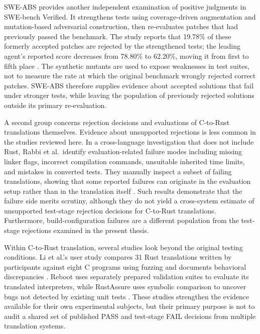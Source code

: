 SWE-ABS provides another independent examination of positive judgments
in SWE-bench Verified. It strengthens tests using coverage-driven
augmentation and mutation-based adversarial construction, then
re-evaluates patches that had previously passed the benchmark. The study
reports that 19.78\% of these formerly accepted patches are rejected by
the strengthened tests; the leading agent's reported score decreases
from 78.80\% to 62.20\%, moving it from first to fifth place
\cite{yu2026sweabs}. The synthetic mutants are used to expose weaknesses
in test suites, not to measure the rate at which the original benchmark
wrongly rejected correct patches. SWE-ABS therefore supplies evidence
about accepted solutions that fail under stronger tests, while leaving
the population of previously rejected solutions outside its primary
re-evaluation.

A second group concerns rejection decisions and evaluations of C-to-Rust
translations themselves. Evidence about unsupported rejections is less
common in the studies reviewed here. In a cross-language investigation that does not include
Rust, Rabbi et al.~identify evaluation-related failure modes including
missing linker flags, incorrect compilation commands, unsuitable
inherited time limits, and mistakes in converted tests. They manually
inspect a subset of failing translations, showing that some reported
failures can originate in the evaluation setup rather than in the
translation itself \cite{rabbi2026beyond}. Such results demonstrate that
the failure side merits scrutiny, although they do not yield a
cross-system estimate of unsupported test-stage rejection decisions for
C-to-Rust translations. Furthermore, build-configuration failures are a
different population from the test-stage rejections examined in the
present thesis.

Within C-to-Rust translation, several studies look beyond the original
testing conditions. Li et al.'s user study compares 31 Rust translations
written by participants against eight C programs using fuzzing and
documents behavioral discrepancies \cite{li2025userstudy}. Reboot uses
separately prepared validation suites to evaluate its translated
interpreters, while RustAssure uses symbolic comparison to uncover bugs
not detected by existing unit tests
\cite{wang2026reboot,bai2025rustassure}. These studies strengthen the
evidence available for their own experimental subjects, but their
primary purpose is not to audit a shared set of published PASS and
test-stage FAIL decisions from multiple translation systems.


